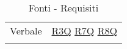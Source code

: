 \begin{center}
\begin{longtable}[!h]{m{50px} m{50px}}
        Verbale                           & \hyperref[tab:RequisitiQualita]{R3Q}
        \newline \hyperref[tab:RequisitiQualita]{R7Q} 
        \newline \hyperref[tab:RequisitiQualita]{R8Q}                                   \\



        \rowcolor{white}\caption{Fonti - Requisiti}
    \end{longtable}
\end{center}
